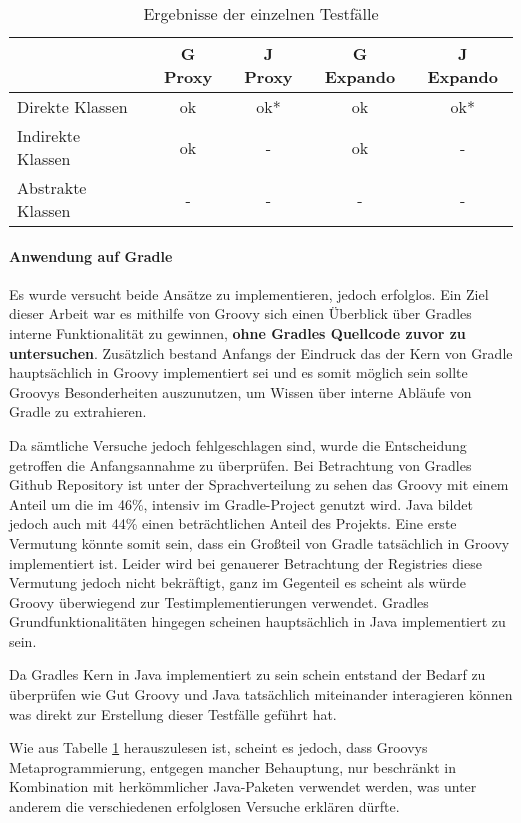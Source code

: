 \begin{table}[hbt!]
	\centering
	\begin{tabular}{| l | c | c | c | c |}
		\hline
		\rule{0pt}{15pt}    & G Proxy & J Proxy & G Expando	& J Expando 	\\ 
		\hline
		Direkte Klassen		& ok 	& ok*  	& ok	& ok* 	\\
		Indirekte Klassen 	& ok 	& {-} 	& ok	& {-} 	\\
		Abstrakte Klassen	& {-} 	& {-} 	& {-}	& {-} 	\\
		\hline
	\end{tabular}
	\caption{Ergebnisse der einzelnen Testfälle}
	\label{tab:meta-result}
\end{table}

\paragraph{Anwendung auf Gradle}

Es wurde versucht beide Ansätze zu implementieren, jedoch erfolglos.
Ein Ziel dieser Arbeit war es mithilfe von Groovy sich einen Überblick über Gradles interne Funktionalität zu  gewinnen, \textbf{ohne Gradles Quellcode zuvor zu untersuchen}. 
Zusätzlich bestand Anfangs der Eindruck das der Kern von Gradle hauptsächlich in Groovy implementiert sei und es somit möglich sein sollte Groovys Besonderheiten auszunutzen, um Wissen über interne Abläufe von Gradle zu extrahieren.

Da sämtliche Versuche jedoch fehlgeschlagen sind, wurde die Entscheidung getroffen die Anfangsannahme zu überprüfen.
Bei Betrachtung von Gradles Github Repository  ist unter der Sprachverteilung zu sehen das Groovy mit einem Anteil um die im 46\%, intensiv im Gradle-Project genutzt wird. 
Java bildet jedoch auch mit 44\% einen beträchtlichen Anteil des Projekts.
Eine erste Vermutung könnte somit sein, dass ein Großteil von Gradle tatsächlich in Groovy implementiert ist.
Leider wird bei genauerer Betrachtung der Registries diese Vermutung jedoch nicht bekräftigt, ganz im Gegenteil es scheint als würde Groovy überwiegend zur Testimplementierungen verwendet.
Gradles Grundfunktionalitäten hingegen scheinen hauptsächlich in Java implementiert zu sein.

Da Gradles Kern in Java implementiert zu sein schein entstand der Bedarf zu überprüfen wie Gut Groovy und Java tatsächlich miteinander interagieren können was direkt zur Erstellung dieser Testfälle geführt hat.

Wie aus Tabelle \ref{tab:meta-result} herauszulesen ist, scheint es jedoch, dass Groovys Metaprogrammierung, entgegen mancher Behauptung, nur beschränkt in Kombination mit herkömmlicher Java-Paketen verwendet werden, was unter anderem die verschiedenen erfolglosen Versuche erklären dürfte.

